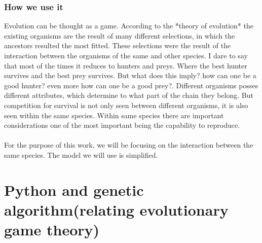\documentclass{article}
\begin{document}
\subsubsection{How we use it}

Evolution can be thought as a game. According to the *theory of evolution* the existing organisms are the result of many different selections, in which the ancestors resulted the most fitted. These selections were the result of the interaction between the organisms of the same and other species. I dare to say that most of the times it reduces to hunters and preys. Where the best hunter survives and the best prey survives. But what does this imply? how can one be a good hunter? even more how can one be a good prey?. Different organisms posses different attributes, which determine to what part of the chain they belong. But competition for survival is not only seen between different organisms, it is also seen within the same species. Within same species there are important considerations one of the most important being the capability to reproduce.
\\\\For the purpose of this work, we will be focusing on the interaction between the same species. The model we will use is simplified.













\section{Python and genetic algorithm(relating evolutionary game theory)}
\end{document}

